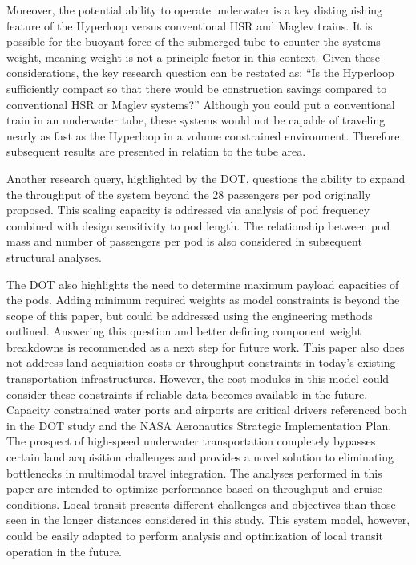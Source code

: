     Moreover, the potential ability to operate underwater is a key distinguishing feature
    of the Hyperloop versus conventional HSR and Maglev trains. It is possible for the buoyant force
    of the submerged tube to counter the systems weight, meaning weight is not
    a principle factor in this context.
    Given these considerations, the key research
    question can be restated as: ``Is the Hyperloop sufficiently compact so
    that there would be construction savings compared to conventional
    HSR or Maglev systems?'' Although you could put a conventional train in an
    underwater tube, these systems would not be capable of traveling nearly as
    fast as the Hyperloop in a volume constrained environment.
    Therefore subsequent results are presented in relation to the tube area.

    Another research query, highlighted by the DOT, questions the ability to
    expand the throughput of the system beyond the 28 passengers per pod
    originally proposed. This scaling capacity is addressed
    via analysis of pod frequency combined with design sensitivity to pod length.
    The relationship between pod mass and number of passengers per pod is also
    considered in subsequent structural analyses.

    The DOT also highlights the need to determine maximum payload capacities
    of the pods. Adding minimum required weights as model constraints is beyond the scope of
    this paper, but could be addressed using the engineering methods outlined.
    Answering this question and better defining component weight breakdowns
    is recommended as a next step for future work.
    This paper also does not address land acquisition costs or throughput
    constraints in today's existing transportation infrastructures.
    However, the cost modules in this model could consider these constraints if
    reliable data becomes available in the future.
    Capacity constrained water ports and airports are critical drivers referenced
    both in the DOT study and the NASA Aeronautics Strategic
    Implementation Plan. The prospect of high-speed underwater transportation
    completely bypasses certain land acquisition challenges and provides a novel solution
    to eliminating bottlenecks in multimodal travel integration. The analyses performed in this paper
    are intended to optimize performance based on throughput and cruise conditions.
    Local transit presents different challenges and objectives than those seen in the longer distances
    considered in this study. This system model, however, could be easily adapted to perform
    analysis and optimization of local transit operation in the future.\\

